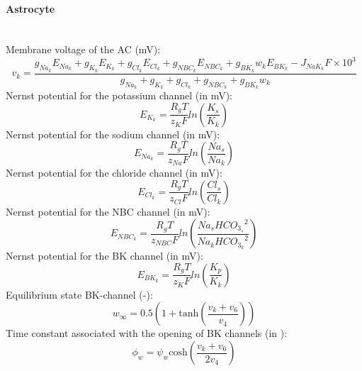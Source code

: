 \paragraph{Astrocyte}~\\
%
Membrane voltage of the \gls{AC} (mV):
\begin{equation} \label{eq:v_k}
v_k=\frac{g_{Na_k}E_{Na_k}+g_{K_k}E_{K_k}+g_{Cl_k}E_{Cl_k}+g_{NBC_k}E_{NBC_k} + g_{BK_k}w_kE_{BK_k} -J_{NaK_k}F \times 10^3 }{ g_{Na_k}+g_{K_k}+g_{Cl_k}+g_{NBC_k}+g_{BK_k}w_k }
\end{equation}
%
Nernst potential for the potassium channel (in mV):
\begin{equation} \label{eq:E_K}
E_{K_k}=\frac{R_gT}{z_K F}ln\left( \frac{K_s}{K_k}\right) 
\end{equation}
%
Nernst potential for the sodium channel (in mV):
\begin{equation} \label{eq:E_Na}
E_{Na_k}=\frac{R_gT}{z_{Na} F}ln\left( \frac{Na_s}{Na_k}\right) 
\end{equation}
%
Nernst potential for the chloride channel (in mV):
\begin{equation} \label{eq:E_Cl}
E_{Cl_k}=\frac{R_gT}{z_{Cl} F}ln\left( \frac{Cl_s}{Cl_k}\right) 
\end{equation}
%
Nernst potential for the NBC channel (in mV):
\begin{equation} \label{eq:E_NBC}
E_{NBC_k}=\frac{R_gT}{z_{NBC} F}ln\left( \frac{Na_s {HCO_{3_s}}^2}{Na_k {HCO_{3_k}}^2}\right) 
\end{equation}
Nernst potential for the BK channel (in mV):
\begin{equation} \label{eq:E_BK}
E_{BK_k}=\frac{R_gT}{z_K F}ln\left( \frac{K_p}{K_k}\right) 
\end{equation}
%
Equilibrium state BK-channel (-):
\begin{equation} \label{eq:winf}
w_{\infty}=0.5 \left(1+\mathrm{tanh}\left(\frac{v_{k}+v_{6} }{v_{4}} \right)  \right) 
\end{equation}
%
Time constant associated with the opening of BK channels	 (in \pers):
\begin{equation} \label{eq:phin}
\phi_{w}=\psi_{w}\mathrm{cosh}\left( \frac{v_{k}+v_{6}}{2v_{4}}\right) 
\end{equation}

